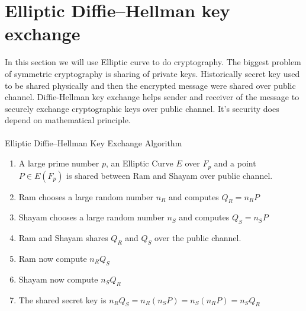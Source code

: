 \documentclass[12pt,a4paper]{report}
\begin{document}
\section{Elliptic Diﬃe–Hellman key exchange}
In this section we will use Elliptic curve to do cryptography. The biggest problem of symmetric cryptography is sharing of private keys. Historically secret key used to be shared physically and then the encrypted message were shared over public channel. Diffie-Hellman key exchange helps sender and receiver of the message to securely exchange cryptographic keys over public channel. It's security does depend on mathematical principle. \\\\
Elliptic Diﬃe–Hellman Key Exchange Algorithm
\begin{enumerate}
	\item A large prime number $p$, an Elliptic Curve $E$ over $F_p$ and a point $P \in E(F_p)$  is shared between Ram and Shayam over public channel.
	\item Ram chooses a large random number $n_R$ and computes $Q_R = n_R P$
	\item Shayam chooses a large random number $n_S$ and computes $Q_S = n_S P$
	\item Ram and Shayam shares $Q_R$ and $Q_S$ over the public channel.
	\item Ram now compute $n_R Q_S$
	\item Shayam now compute $n_S Q_R$
	\item The shared secret key is $n_R Q_S=n_R (n_S P)=n_S (n_R P)=n_S Q_R$
\end{enumerate}



\end{document}
